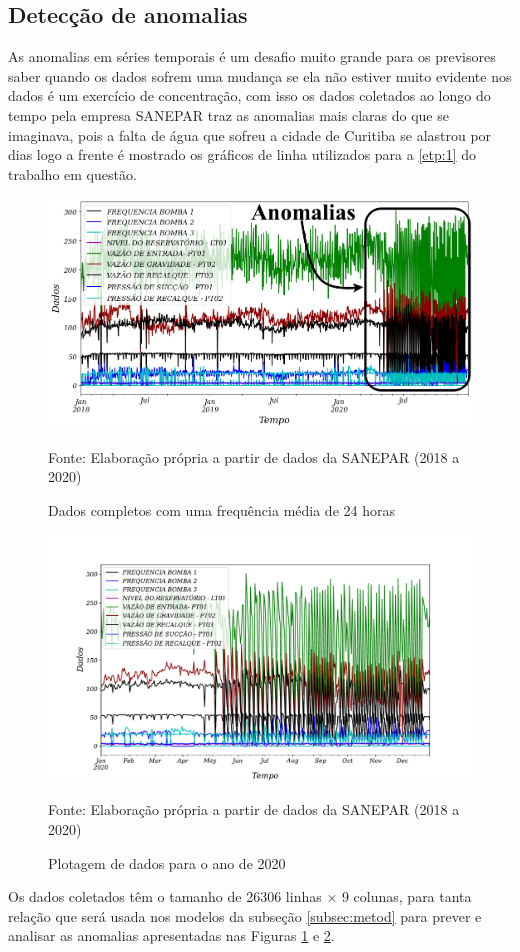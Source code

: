  

\subsection{Detec\c cão de anomalias} \label{subsec:detec}


As anomalias em séries temporais é um desafio muito grande para os previsores saber quando os dados sofrem uma mudança se ela não estiver muito evidente nos dados é um exercício de concentração, com isso os dados coletados ao longo do tempo pela empresa SANEPAR traz as anomalias mais claras do que se imaginava, pois a falta de água que sofreu a cidade de Curitiba se alastrou por dias logo a frente é mostrado os gráficos de linha utilizados para a \ref{etp:1} do trabalho em questão.

\begin{figure}[H]
	\centering
	\caption{Dados completos com uma frequência média de 24 horas}
	\label{fig:dados-todos}
	\includegraphics[width=0.9\linewidth]{"Introducao/Figuras/dados todos"}
	
	Fonte: Elaboração própria a partir de dados da SANEPAR (2018 a 2020)
\end{figure}

\begin{figure}[H]
	\centering
	\caption{Plotagem de dados para o ano de 2020}
	\label{fig:2020-a-frente}
	\includegraphics[width=0.9\linewidth]{"Introducao/Figuras/2020 a frente"}
	
	Fonte: Elaboração própria a partir de dados da SANEPAR (2018 a 2020)
\end{figure}

Os dados coletados têm o tamanho de 26306 linhas × 9 colunas, para tanta relação que será usada nos modelos da subseção \ref{subsec:metod} para prever e analisar as anomalias apresentadas nas Figuras \ref{fig:dados-todos} e \ref{fig:2020-a-frente}.






